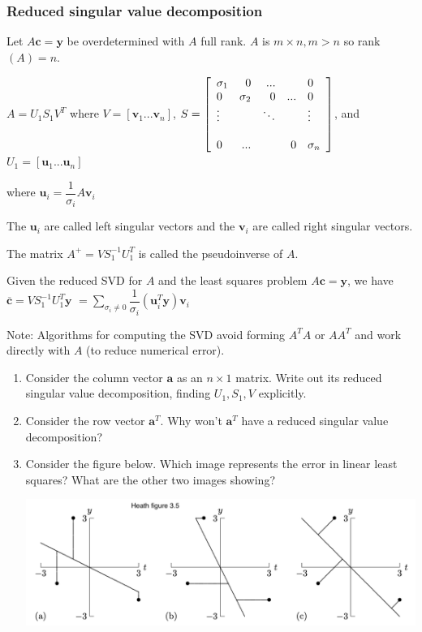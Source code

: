 \documentclass[12pt,letterpaper,noanswers]{exam}
\begin{document}
\subsubsection{Reduced singular value decomposition}

Let $A\mathbf{c} = \mathbf{y}$ be overdetermined with $A$ full rank.  $A$ is $m\times n, m>n$ so rank$(A) = n$.

$A = U_1 S_1 V^T$ where $V = \left[\mathbf{v}_1 ... \mathbf{v}_n\right]$, $S = \left[\begin{array}{l r r r l}\sigma_1 & 0 & ... & & 0\\
0 & \sigma_2 & 0 & ... & 0 \\
\vdots & & \ddots & & \vdots \\
\\
0 & ... & & 0 & \sigma_n\end{array}\right]$, and $U_1 = \left[\mathbf{u}_1 ... \mathbf{u}_n \right]$

where $\mathbf{u}_i = \dfrac{1}{\sigma_i}A\mathbf{v}_i$

The $\mathbf{u}_i$ are called left singular vectors and the $\mathbf{v}_i$ are called right singular vectors.

The matrix $A^+ = VS_1^{-1}U_1^T$ is called the pseudoinverse of $A$.



Given the reduced SVD for $A$ and the least squares problem
$A\mathbf{c} = \mathbf{y}$, we have
$\overline{\mathbf{c}} = VS_1^{-1}U_1^T\mathbf{y}$ $=\sum\limits_{\sigma_i\neq 0} \dfrac{1}{\sigma_i}(\mathbf{u}_i^T\mathbf{y})\mathbf{v}_i$




Note: Algorithms for computing the SVD avoid forming $A^TA$ or $AA^T$ and work directly with $A$ (to reduce numerical error).


\begin{enumerate}[resume]


\item Consider the column vector $\mathbf{a}$ as an $n\times 1$ matrix.  Write out its reduced singular value decomposition, finding $U_1, S_1, V$ explicitly.

\item Consider the row vector $\mathbf{a}^T$.  Why won't $\mathbf{a}^T$ have a reduced singular value decomposition?

\item Consider the figure below.  Which image represents the error in linear least squares?  What are the other two images showing?


\includegraphics[width=\textwidth]{AM111-F23-CourseNotes/img/leastsquares.png}
\end{enumerate}
\end{document}
